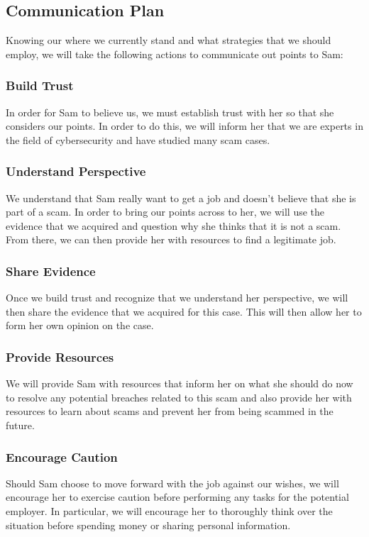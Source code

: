 \begin{fullwidth}
\subsection{Communication Plan}
Knowing our where we currently stand and what strategies that we should employ, we will take the following actions to communicate out points to Sam:

\subsubsection{Build Trust}
In order for Sam to believe us, we must establish trust with her so that she considers our points. In order to do this, we will inform her that we are experts in the field of cybersecurity and have studied many scam cases.
\subsubsection{Understand Perspective}
We understand that Sam really want to get a job and doesn't believe that she is part of a scam. In order to bring our points across to her, we will use the evidence that we acquired and question why she thinks that it is not a scam. From there, we can then provide her with resources to find a legitimate job.
\subsubsection{Share Evidence}
Once we build trust and recognize that we understand her perspective, we will then share the evidence that we acquired for this case. This will then allow her to form her own opinion on the case.
\subsubsection{Provide Resources}
We will provide Sam with resources that inform her on what she should do now to resolve any potential breaches related to this scam and also provide her with resources to learn about scams and prevent her from being scammed in the future.
\subsubsection{Encourage Caution}
Should Sam choose to move forward with the job against our wishes, we will encourage her to exercise caution before performing any tasks for the potential employer. In particular, we will encourage her to thoroughly think over the situation before spending money or sharing personal information.

\end{fullwidth}